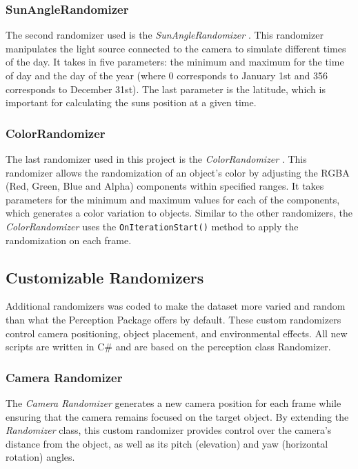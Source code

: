 \subsubsection{SunAngleRandomizer}
The second randomizer used is the \textit{SunAngleRandomizer} \cite{sun_angle_randomizer}. This randomizer manipulates the light source connected to the camera to simulate different times of the day. It takes in five parameters: the minimum and maximum for the time of day and the day of the year (where 0 corresponds to January 1st and 356 corresponds to December 31st). The last parameter is the latitude, which is important for calculating the suns position at a given time.

\subsubsection{ColorRandomizer}
The last randomizer used in this project is the \textit{ColorRandomizer} \cite{color_randomizer}. This randomizer allows the randomization of an object's color by adjusting the RGBA (Red, Green, Blue and Alpha) components within specified ranges. It takes parameters for the minimum and maximum values for each of the components, which generates a color variation to objects. Similar to the other randomizers, the \textit{ColorRandomizer} uses the \texttt{OnIterationStart()} method to apply the randomization on each frame.


\subsection{Customizable Randomizers}
Additional randomizers was coded to make the dataset more varied and random than what the Perception Package offers by default. These custom randomizers control camera positioning, object placement, and environmental effects. All new scripts are written in C\# and are based on the perception class Randomizer.

\subsubsection{Camera Randomizer}
The \textit{Camera Randomizer} generates a new camera position for each frame while ensuring that the camera remains focused on the target object. By extending the \textit{Randomizer} class, this custom randomizer provides control over the camera's distance from the object, as well as its pitch (elevation) and yaw (horizontal rotation) angles. \\

